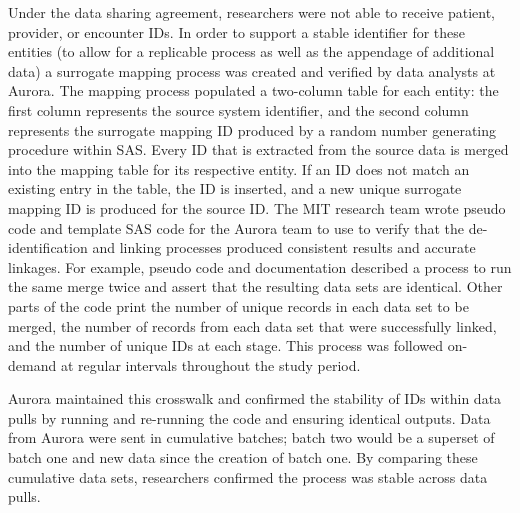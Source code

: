 \documentclass[
]{book}
\begin{document}
Under the data sharing agreement, researchers were not able to receive patient, provider, or encounter IDs. In order to support a stable identifier for these entities (to allow for a replicable process as well as the appendage of additional data) a surrogate mapping process was created and verified by data analysts at Aurora. The mapping process populated a two-column table for each entity: the first column represents the source system identifier, and the second column represents the surrogate mapping ID produced by a random number generating procedure within SAS. Every ID that is extracted from the source data is merged into the mapping table for its respective entity. If an ID does not match an existing entry in the table, the ID is inserted, and a new unique surrogate mapping ID is produced for the source ID. The MIT research team wrote pseudo code and template SAS code for the Aurora team to use to verify that the de-identification and linking processes produced consistent results and accurate linkages. For example, pseudo code and documentation described a process to run the same merge twice and assert that the resulting data sets are identical. Other parts of the code print the number of unique records in each data set to be merged, the number of records from each data set that were successfully linked, and the number of unique IDs at each stage. This process was followed on-demand at regular intervals throughout the study period.

Aurora maintained this crosswalk and confirmed the stability of IDs within data pulls by running and re-running the code and ensuring identical outputs. Data from Aurora were sent in cumulative batches; batch two would be a superset of batch one and new data since the creation of batch one. By comparing these cumulative data sets, researchers confirmed the process was stable across data pulls.
\end{document}
